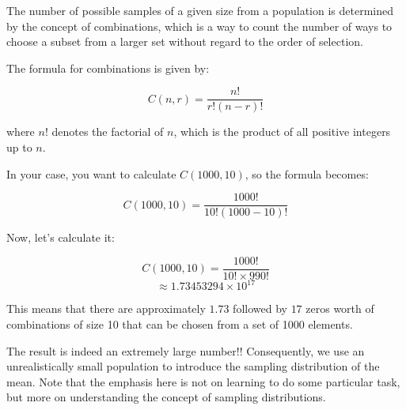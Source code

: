 \documentclass[12pt,a4paper]{article}
\theoremstyle{example}
\theoremstyle{definition}
\theoremstyle{theorem}
\begin{document}
The number of possible samples of a given size from a population is determined by the concept of combinations, which is a way to count the number of ways to choose a subset from a larger set without regard to the order of selection.

The formula for combinations is given by:



\[ C(n, r) = \frac{n!}{r!(n-r)!} \]

where \( n! \) denotes the factorial of \( n \), which is the product of all positive integers up to \( n \).

In your case, you want to calculate \( C(1000, 10) \), so the formula becomes:

\[ C(1000, 10) = \frac{1000!}{10!(1000-10)!} \]

Now, let's calculate it:

\[ C(1000, 10) = \frac{1000!}{10! \times 990!} \] \[  \approx 1.73453294 \times 10^{17} \]

This means that there are approximately \( 1.73 \) followed by \( 17 \) zeros worth of combinations of size 10 that can be chosen from a set of 1000 elements.

 The result is indeed an extremely large number!!
Consequently, we use an unrealistically small population to introduce the sampling
distribution of the mean. Note that the emphasis here is not on learning to do some
particular task, but more on understanding the concept of sampling distributions.
\end{document}
